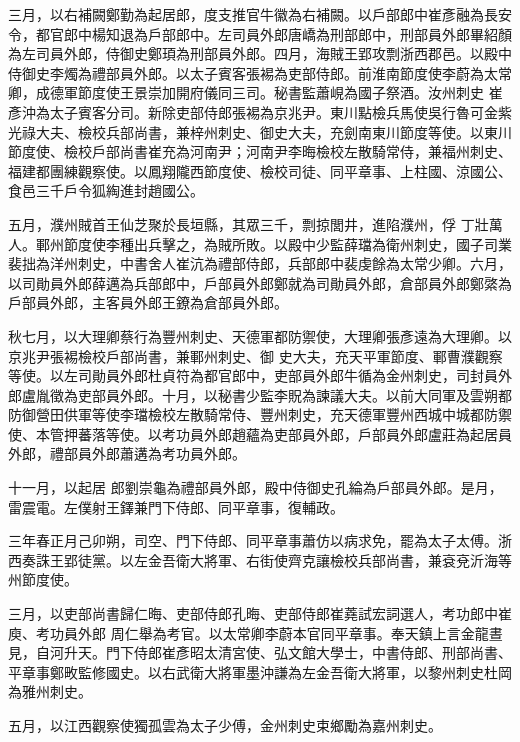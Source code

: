 \begin{pinyinscope}
 三月，以右補闕鄭勤為起居郎，度支推官牛徽為右補闕。以戶部郎中崔彥融為長安令，都官郎中楊知退為戶部郎中。左司員外郎唐嶠為刑部郎中，刑部員外郎畢紹顏為左司員外郎，侍御史鄭頊為刑部員外郎。四月，海賊王郢攻剽浙西郡邑。以殿中侍御史李燭為禮部員外郎。以太子賓客張裼為吏部侍郎。前淮南節度使李蔚為太常卿，成德軍節度使王景崇加開府儀同三司。秘書監蕭峴為國子祭酒。汝州刺史
 崔彥沖為太子賓客分司。新除吏部侍郎張裼為京兆尹。東川點檢兵馬使吳行魯可金紫光祿大夫、檢校兵部尚書，兼梓州刺史、御史大夫，充劍南東川節度等使。以東川節度使、檢校戶部尚書崔充為河南尹；河南尹李晦檢校左散騎常侍，兼福州刺史、福建都團練觀察使。以鳳翔隴西節度使、檢校司徒、同平章事、上柱國、涼國公、食邑三千戶令狐綯進封趙國公。



 五月，濮州賊首王仙芝聚於長垣縣，其眾三千，剽掠閭井，進陷濮州，俘
 丁壯萬人。鄆州節度使李種出兵擊之，為賊所敗。以殿中少監薛璫為衛州刺史，國子司業裴拙為洋州刺史，中書舍人崔沆為禮部侍郎，兵部郎中裴虔餘為太常少卿。六月，以司勛員外郎薛邁為兵部郎中，戶部員外郎鄭就為司勛員外郎，倉部員外郎鄭綮為戶部員外郎，主客員外郎王鐐為倉部員外郎。



 秋七月，以大理卿蔡行為豐州刺史、天德軍都防禦使，大理卿張彥遠為大理卿。以京兆尹張裼檢校戶部尚書，兼鄆州刺史、御
 史大夫，充天平軍節度、鄆曹濮觀察等使。以左司勛員外郎杜貞符為都官郎中，吏部員外郎牛循為金州刺史，司封員外郎盧胤徵為吏部員外郎。十月，以秘書少監李貺為諫議大夫。以前大同軍及雲朔都防御營田供軍等使李璫檢校左散騎常侍、豐州刺史，充天德軍豐州西城中城都防禦使、本管押蕃落等使。以考功員外郎趙蘊為吏部員外郎，戶部員外郎盧莊為起居員外郎，禮部員外郎蕭遘為考功員外郎。



 十一月，以起居
 郎劉崇龜為禮部員外郎，殿中侍御史孔綸為戶部員外郎。是月，雷震電。左僕射王鐸兼門下侍郎、同平章事，復輔政。



 三年春正月己卯朔，司空、門下侍郎、同平章事蕭仿以病求免，罷為太子太傅。浙西奏誅王郢徒黨。以左金吾衛大將軍、右街使齊克讓檢校兵部尚書，兼袞兗沂海等州節度使。



 三月，以吏部尚書歸仁晦、吏部侍郎孔晦、吏部侍郎崔蕘試宏詞選人，考功郎中崔庾、考功員外郎
 周仁舉為考官。以太常卿李蔚本官同平章事。奉天鎮上言金龍晝見，自河升天。門下侍郎崔彥昭太清宮使、弘文館大學士，中書侍郎、刑部尚書、平章事鄭畋監修國史。以右武衛大將軍墨沖謙為左金吾衛大將軍，以黎州刺史杜岡為雅州刺史。



 五月，以江西觀察使獨孤雲為太子少傅，金州刺史束鄉勵為嘉州刺史。




\end{pinyinscope}
